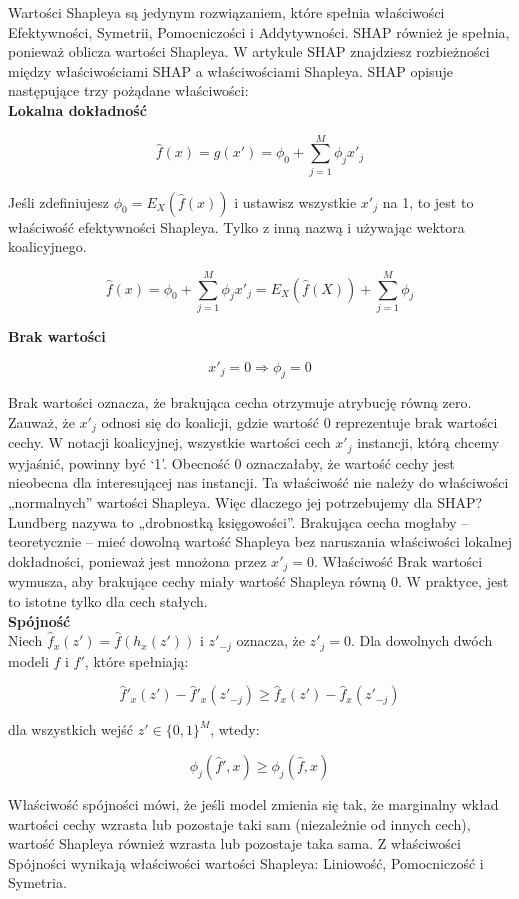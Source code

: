 Wartości Shapleya są jedynym rozwiązaniem, które spełnia właściwości Efektywności, Symetrii, Pomocniczości i Addytywności. SHAP również je spełnia, ponieważ oblicza wartości Shapleya. W artykule SHAP znajdziesz rozbieżności między właściwościami SHAP a właściwościami Shapleya. SHAP opisuje następujące trzy pożądane właściwości:\\

\textbf{Lokalna dokładność}

\[
\hat{f}(x) = g(x') = \phi_0 + \sum_{j=1}^M \phi_j x'_j
\]

Jeśli zdefiniujesz $\phi_0 = E_X(\hat{f}(x))$ i ustawisz wszystkie $x'_j$ na 1, to jest to właściwość efektywności Shapleya. Tylko z inną nazwą i używając wektora koalicyjnego.

\[
\hat{f}(x) = \phi_0 + \sum_{j=1}^M \phi_j x'_j = E_X(\hat{f}(X)) + \sum_{j=1}^M \phi_j
\]

\textbf{Brak wartości}

\[
x'_j = 0 \Rightarrow \phi_j = 0
\]

Brak wartości oznacza, że brakująca cecha otrzymuje atrybucję równą zero. Zauważ, że $x'_j$ odnosi się do koalicji, gdzie wartość 0 reprezentuje brak wartości cechy. W notacji koalicyjnej, wszystkie wartości cech $x'_j$ instancji, którą chcemy wyjaśnić, powinny być ‘1’. Obecność 0 oznaczałaby, że wartość cechy jest nieobecna dla interesującej nas instancji. Ta właściwość nie należy do właściwości „normalnych” wartości Shapleya. Więc dlaczego jej potrzebujemy dla SHAP? Lundberg nazywa to „drobnostką księgowości”. Brakująca cecha mogłaby – teoretycznie – mieć dowolną wartość Shapleya bez naruszania właściwości lokalnej dokładności, ponieważ jest mnożona przez $x'_j = 0$. Właściwość Brak wartości wymusza, aby brakujące cechy miały wartość Shapleya równą 0. W praktyce, jest to istotne tylko dla cech stałych.\\

\textbf{Spójność}\\

Niech $\hat{f}_x(z') = \hat{f}(h_x(z'))$ i $z'_{-j}$ oznacza, że $z'_j = 0$. Dla dowolnych dwóch modeli $f$ i $f'$, które spełniają:

\[
\hat{f}'_x(z') - \hat{f}'_x(z'_{-j}) \ge \hat{f}_x(z') - \hat{f}_x(z'_{-j})
\]

dla wszystkich wejść $z' \in \{0,1\}^M$, wtedy:

\[
\phi_j(\hat{f}',x) \ge \phi_j(\hat{f},x)
\]

Właściwość spójności mówi, że jeśli model zmienia się tak, że marginalny wkład wartości cechy wzrasta lub pozostaje taki sam (niezależnie od innych cech), wartość Shapleya również wzrasta lub pozostaje taka sama. Z właściwości Spójności wynikają właściwości wartości Shapleya: Liniowość, Pomocniczość i Symetria. \cite{shap} \\

